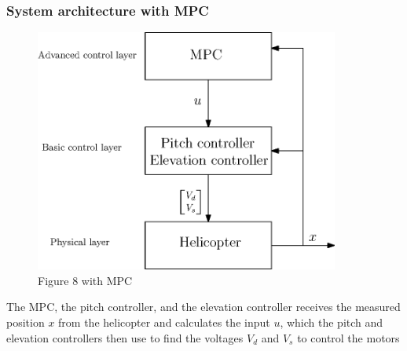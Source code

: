 \subsubsection{System architecture with MPC}
\begin{figure}[H]
	\centering
	\includegraphics[width=10cm]{figurate_with_MPC}
	\caption{Figure 8 with MPC}
	\label{fig:figurate}
\end{figure}

The MPC, the pitch controller, and the elevation controller receives the measured position $x$ from the helicopter and calculates the input $u$, which the pitch and elevation controllers then use to find the voltages $V_d$ and $V_s$ to control the motors
